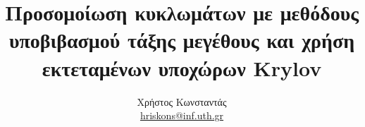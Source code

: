\documentclass[a4paper,12pt]{report}
\def\tl{\textlatin}
\theoremstyle{definition}
\theoremstyle{remark}
\begin{document}


\title{Προσομοίωση κυκλωμάτων με μεθόδους 
υποβιβασμού τάξης μεγέθους και χρήση εκτεταμένων υποχώρων 
Krylov
}
\author{Χρήστος Κωνσταντάς \\
\href{mailto:hriskons@inf.uth.gr}{\tl{hriskons@inf.uth.gr}}}
\maketitle

\tableofcontents
\thispagestyle{empty}









\appendix







\end{document}

